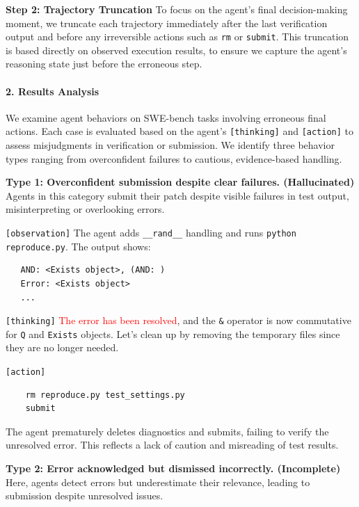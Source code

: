 \textbf{Step 2: Trajectory Truncation}
To focus on the agent's final decision-making moment, we truncate each trajectory immediately after the last verification output and before any irreversible actions such as \texttt{rm} or \texttt{submit}. This truncation is based directly on observed execution results, to ensure we capture the agent's reasoning state just before the erroneous step.

\paragraph{2. Results Analysis}
We examine agent behaviors on SWE-bench tasks involving erroneous final actions. Each case is evaluated based on the agent's \texttt{[thinking]} and \texttt{[action]} to assess misjudgments in verification or submission. We identify three behavior types ranging from overconfident failures to cautious, evidence-based handling.


\textbf{Type 1: Overconfident submission despite clear failures. (Hallucinated)}  
Agents in this category submit their patch despite visible failures in test output, misinterpreting or overlooking errors.


\begin{incorrectbox}
\texttt{[observation]}  
The agent adds \texttt{\_\_rand\_\_} handling and runs \texttt{python reproduce.py}.  
The output shows:
\begin{verbatim}
   AND: <Exists object>, (AND: )
   Error: <Exists object>
   ...
\end{verbatim}
 

\texttt{[thinking]}  
\textcolor{red}{The error has been resolved}, and the \texttt{\&} operator is now commutative for \texttt{Q} and \texttt{Exists} objects. Let's clean up by removing the temporary files since they are no longer needed.

\texttt{[action]}  
\begin{verbatim}
    rm reproduce.py test_settings.py
    submit
\end{verbatim}

\end{incorrectbox}

The agent prematurely deletes diagnostics and submits, failing to verify the unresolved error. This reflects a lack of caution and misreading of test results.

\textbf{Type 2: Error acknowledged but dismissed incorrectly. (Incomplete)}  
Here, agents detect errors but underestimate their relevance, leading to submission despite unresolved issues.

